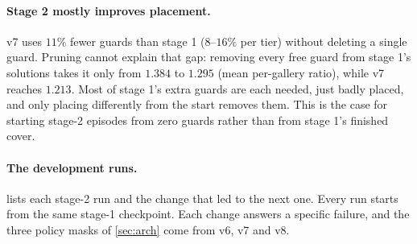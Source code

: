 \documentclass[11pt,a4paper]{article}
\begin{document}
\paragraph{Stage 2 mostly improves placement.} v7 uses $11\%$ fewer guards than stage 1
($8$--$16\%$ per tier) without deleting a single guard. Pruning cannot explain that gap: removing every
free guard from stage 1's solutions takes it only from $1.384$ to $1.295$ (mean per-gallery
ratio), while v7 reaches $1.213$. Most of stage 1's extra guards are each needed, just badly
placed, and only placing differently from the start removes them. This is the case for
starting stage-2 episodes from zero guards rather than from stage 1's finished cover.

\paragraph{The development runs.}  lists each stage-2 run and the change that
led to the next one. Every run starts from the same stage-1 checkpoint. Each change answers a
specific failure, and the three policy masks of \cref{sec:arch} come from v6, v7 and v8.
\end{document}
